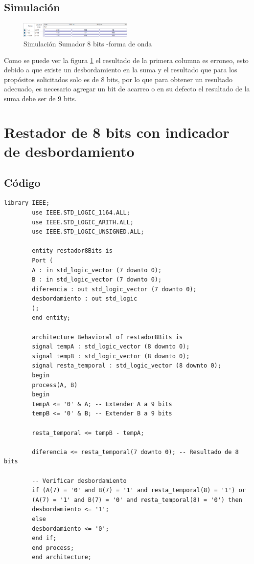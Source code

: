 \documentclass[conference]{IEEEtran}
\begin{document}
	\subsection{Simulación}
	\begin{figure}[h]
		\centering
		\includegraphics[width=0.5\textwidth]{media/sumador8bits}
		\caption{Simulación Sumador 8 bits -forma de onda}
		\label{fig:sumador8bits}
	\end{figure}
	
	Como se puede ver la figura \ref{fig:sumador8bits} el resultado de la primera columna es erroneo, esto debido a que existe un desbordamiento en la suma y el resultado que para los propósitos solicitados solo es de 8 bits, por lo que para obtener un resultado adecuado, es necesario agregar un bit de acarreo o en su defecto el resultado de la suma debe ser de 9 bits.
	
	\section{Restador de 8 bits con indicador de desbordamiento}
	\subsection{Código}
	\begin{lstlisting}[numbers=none]
		library IEEE;
		use IEEE.STD_LOGIC_1164.ALL;
		use IEEE.STD_LOGIC_ARITH.ALL;
		use IEEE.STD_LOGIC_UNSIGNED.ALL;
		
		entity restador8Bits is
		Port (
		A : in std_logic_vector (7 downto 0);
		B : in std_logic_vector (7 downto 0);
		diferencia : out std_logic_vector (7 downto 0);
		desbordamiento : out std_logic
		);
		end entity;
		
		architecture Behavioral of restador8Bits is
		signal tempA : std_logic_vector (8 downto 0);
		signal tempB : std_logic_vector (8 downto 0);
		signal resta_temporal : std_logic_vector (8 downto 0);
		begin
		process(A, B)
		begin
		tempA <= '0' & A; -- Extender A a 9 bits
		tempB <= '0' & B; -- Extender B a 9 bits
		
		resta_temporal <= tempB - tempA;
		
		diferencia <= resta_temporal(7 downto 0); -- Resultado de 8 bits
		
		-- Verificar desbordamiento
		if (A(7) = '0' and B(7) = '1' and resta_temporal(8) = '1') or
		(A(7) = '1' and B(7) = '0' and resta_temporal(8) = '0') then
		desbordamiento <= '1';
		else
		desbordamiento <= '0';
		end if;
		end process;
		end architecture;
		
	\end{lstlisting}
\end{document}
